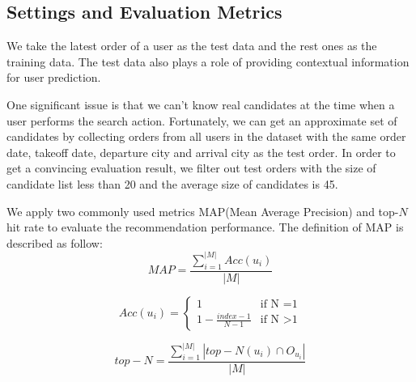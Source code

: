 \documentclass{llncs}
\begin{document}
\subsection{Settings and Evaluation Metrics}
We take the latest order of a user as the test data and the rest ones as the training data. The test data also plays a role of providing contextual information for user prediction.\par
One significant issue is that we can't know real candidates at the time when a user performs the search action. Fortunately, we can get an approximate set of candidates by collecting orders from all users in the dataset with the same order date, takeoff date, departure city and arrival city as the test order. In order to get a convincing evaluation result, we filter out test orders with the size of candidate list less than 20 and the average size of candidates is 45.\par
We apply two commonly used metrics MAP(Mean Average Precision) and top-$N$ hit rate to evaluate the recommendation performance. The definition of MAP is described as follow:\\
\begin{equation}
MAP = \frac{\sum_{i=1}^{|M|}Acc(u_i)}{|M|}
\end{equation}

\begin{equation}
Acc(u_i) =
\begin{cases}
1 & \mbox{if N =1}\\
1 - \frac{index-1}{N-1} & \mbox{if N >1}
\end{cases}
\end{equation}

\begin{equation}
top-N = \frac{\sum_{i=1}^{|M|}|top-N(u_i) \cap O_{u_i}|}{|M|}
\end{equation}
\end{document}
